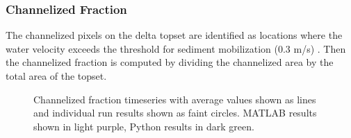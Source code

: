 \documentclass[a4paper]{article}
\begin{document}
\subsubsection{Channelized Fraction}
The channelized pixels on the delta topset are identified as locations where the water velocity exceeds the threshold for sediment mobilization (0.3 m/s) \cite{Liang2016a,Liang2016,Lauzon2018,Lauzon2019}.
Then the channelized fraction is computed by dividing the channelized area by the total area of the topset.

\begin{figure}[!ht]
	\caption{Channelized fraction timeseries with average values shown as lines and individual run results shown as faint circles. MATLAB results shown in light purple, Python results in dark green.}
	\label{fig:channelfraction}
\end{figure}
\end{document}

